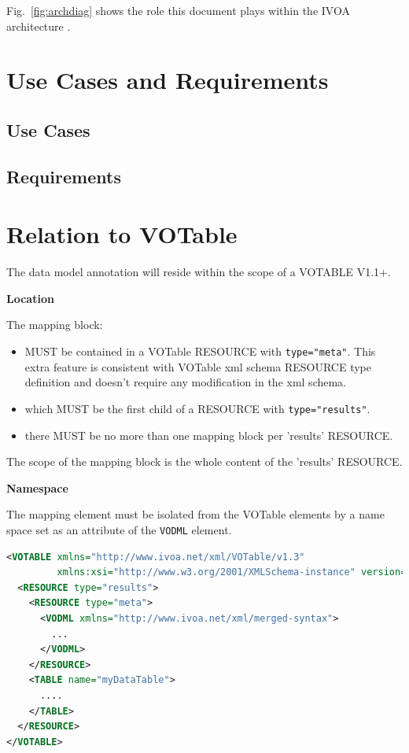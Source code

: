 \documentclass[11pt,a4paper]{ivoa}
\begin{document}
Fig.~\ref{fig:archdiag} shows the role this document plays within
the IVOA architecture \citep{2010ivoa.rept.1123A}.


\pagebreak
\section{Use Cases and Requirements}

\subsection{Use Cases}



\subsection{Requirements}



\lstset{language=XML}

\pagebreak
\section{Relation to VOTable}

The data model annotation will reside within the scope of a VOTABLE V1.1+.


\noindent \textbf{Location}

The mapping block:
\begin{itemize}
\item MUST be contained in a VOTable RESOURCE with \texttt{type="meta"}. This extra feature is consistent with VOTable xml schema RESOURCE type definition and doesn't require any modification in the xml schema.
\item which MUST be the first child of a RESOURCE with \texttt{type="results"}.
\item there MUST be no more than one mapping block per 'results' RESOURCE.
\end{itemize}

The scope of the mapping block is the whole content of the 'results' RESOURCE. \newline

\noindent \textbf{Namespace}

The mapping element must be isolated from the VOTable elements by a name space set as an attribute of the \texttt{VODML} element.

\begin{lstlisting}[caption={Mapping block in a VOTable},language=XML]
<VOTABLE xmlns="http://www.ivoa.net/xml/VOTable/v1.3" 
         xmlns:xsi="http://www.w3.org/2001/XMLSchema-instance" version="1.3">
  <RESOURCE type="results">
    <RESOURCE type="meta">
      <VODML xmlns="http://www.ivoa.net/xml/merged-syntax">
        ...
      </VODML>
    </RESOURCE>
    <TABLE name="myDataTable">
      ....
    </TABLE>
  </RESOURCE>
</VOTABLE>
\end{lstlisting}
\end{document}
